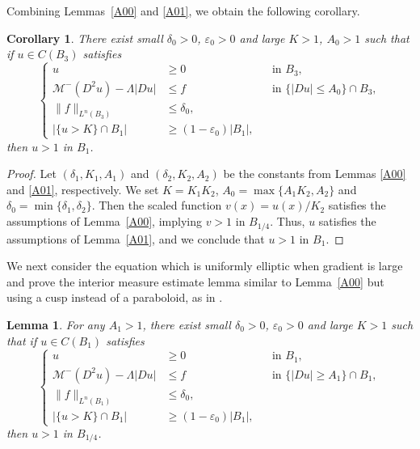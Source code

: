 \documentclass[11pt]{amsart}
\theoremstyle{plain}
\newtheorem{lemma}[theorem]{Lemma}
\newtheorem{corollary}[theorem]{Corollary}
\theoremstyle{definition}
\numberwithin{equation}{section}
\begin{document}
Combining Lemmas~\ref{A00} and \ref{A01}, we obtain the following corollary.
\begin{corollary} \label{A0}
    There exist small $\delta_0>0$, $\varepsilon_0>0$ and large $K>1$, $A_0>1$ such that if  $u \in C(B_3)$ satisfies
    \begin{equation*}
    \left\{
    \begin{aligned}
        u &\geq 0 &&\text{in } B_3,\\
        \mathcal{M}^-(D^2u)-\Lambda|Du| &\leq f &&\text{in } \{|Du| \leq A_0\}\cap B_3, \\
        \|f\|_{L^n(B_3)} &\leq \delta_0, \\
        |\{u>K\} \cap B_1| &\geq (1-\varepsilon_0)|B_1|,
    \end{aligned}
    \right.
    \end{equation*}
    then $u>1$ in $B_1$.
\end{corollary}

\begin{proof}
    Let $(\delta_1,K_1,A_1)$ and $(\delta_2,K_2,A_2)$  be the constants from Lemmas \ref{A00} and \ref{A01}, respectively.
    We set $K=K_1 K_2$, $A_0 = \max \{A_1K_2,A_2\}$ and $\delta_0=\min\{\delta_1, \delta_2\}$.
    Then the scaled function $v(x)=u(x)/K_2$ satisfies the assumptions of Lemma~\ref{A00}, implying $v>1$ in $B_{1/4}$.
    Thus, $u$ satisfies the assumptions of Lemma~\ref{A01}, and we conclude that $u>1$ in $B_1$.
\end{proof}

We next consider the equation which is uniformly elliptic when gradient is large and prove the interior measure estimate lemma similar to Lemma~\ref{A00} but using a cusp instead of a paraboloid, as in \cite{IS16}.

\begin{lemma} \label{A10}
    For any $A_1>1$, there exist small $\delta_0>0$, $\varepsilon_0>0$ and large $K>1$ such that if $u \in C(B_1)$ satisfies
    \begin{equation*}
    \left\{
    \begin{aligned}
        u &\geq 0 &&\text{in } B_1,\\
        \mathcal{M}^-(D^2u)-\Lambda|Du| &\leq f &&\text{in } \{|Du| \geq A_1\}\cap B_1, \\
        \|f\|_{L^n(B_1)} &\leq \delta_0,\\
        |\{u>K\} \cap B_1| &\geq (1-\varepsilon_0)|B_1|,            
    \end{aligned}
    \right.
    \end{equation*}
    then $u>1$ in $B_{1/4}$.
\end{lemma}
\end{document}
